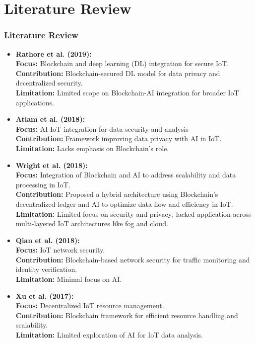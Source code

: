 \documentclass [xcolor=svgnames] {beamer}
\begin{document}
\section{Literature Review}
\begin{frame}[allowframebreaks]
\small
\frametitle{Literature Review}

\begin{itemize}
\item \textbf{Rathore et al. (2019):}\\
\textbf{Focus: }Blockchain and deep learning (DL) integration for secure IoT.\\
\textbf{Contribution: }Blockchain-secured DL model for data privacy and decentralized security.\\
\textbf{Limitation: }Limited scope on Blockchain-AI integration for broader IoT applications.

\item \textbf{Atlam et al. (2018):}\\
\textbf{Focus: }AI-IoT integration for data security and analysis\\
\textbf{Contribution: }Framework improving data privacy with AI in IoT.\\
\textbf{Limitation: }Lacks emphasis on Blockchain’s role.

\item \textbf{Wright et al. (2018):}\\
\textbf{Focus: }Integration of Blockchain and AI to address scalability and data processing in IoT.\\
\textbf{Contribution: }Proposed a hybrid architecture using Blockchain’s decentralized ledger and AI to optimize data flow and efficiency in IoT.\\
\textbf{Limitation: }Limited focus on security and privacy; lacked application across multi-layered IoT architectures like fog and cloud.

\item \textbf{Qian et al. (2018):}\\
\textbf{Focus: }IoT network security.\\
\textbf{Contribution: }Blockchain-based network security for traffic monitoring and identity verification.\\
\textbf{Limitation: }Minimal focus on AI.

\item \textbf{Xu et al. (2017):}\\
\textbf{Focus: }Decentralized IoT resource management.\\
\textbf{Contribution: }Blockchain framework for efficient resource handling and scalability.\\
\textbf{Limitation: }Limited exploration of AI for IoT data analysis.


\end{itemize}
\end{frame}
\end{document}
